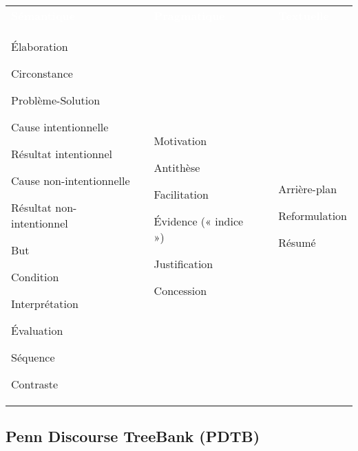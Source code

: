 \documentclass{KodeBook}
\begin{document}
\begin{tabular}{p{}lp{}lp{}}
	\rowcolor{darkblue}
	\bfseries\textcolor{white}{Sémantique} && \bfseries\textcolor{white}{Pragmatique} && \bfseries\textcolor{white}{Textuelle} \\
	
	Élaboration
	
	Circonstance
	
	Problème-Solution
	
	Cause intentionnelle
	
	Résultat intentionnel
	
	Cause non-intentionnelle
	
	Résultat non-intentionnel
	
	But
	
	Condition
	
	Interprétation
	
	Évaluation
	
	Séquence
	
	Contraste
	
	&&
	
	Motivation
	
	Antithèse
	
	Facilitation
	
	Évidence (« indice »)
	
	Justification
	
	Concession
	
	&&
	
	Arrière-plan
	
	Reformulation
	
	Résumé\\
\end{tabular}

\subsection{Penn Discourse TreeBank (PDTB)}
\end{document}
